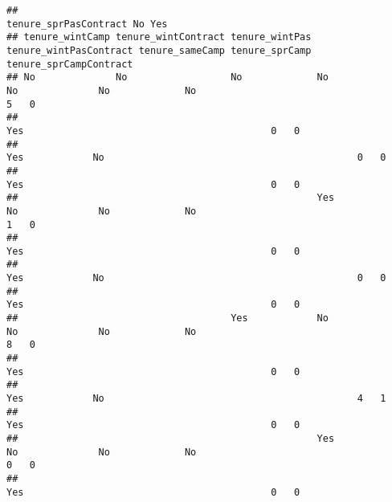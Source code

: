 \documentclass[
]{article}
\begin{document}
\begin{verbatim}
##                                                                                                                                 tenure_sprPasContract No Yes
## tenure_wintCamp tenure_wintContract tenure_wintPas tenure_wintPasContract tenure_sameCamp tenure_sprCamp tenure_sprCampContract                             
## No              No                  No             No                     No              No             No                                            5   0
##                                                                                                          Yes                                           0   0
##                                                                                           Yes            No                                            0   0
##                                                                                                          Yes                                           0   0
##                                                    Yes                    No              No             No                                            1   0
##                                                                                                          Yes                                           0   0
##                                                                                           Yes            No                                            0   0
##                                                                                                          Yes                                           0   0
##                                     Yes            No                     No              No             No                                            8   0
##                                                                                                          Yes                                           0   0
##                                                                                           Yes            No                                            4   1
##                                                                                                          Yes                                           0   0
##                                                    Yes                    No              No             No                                            0   0
##                                                                                                          Yes                                           0   0

\end{verbatim}
\end{document}
